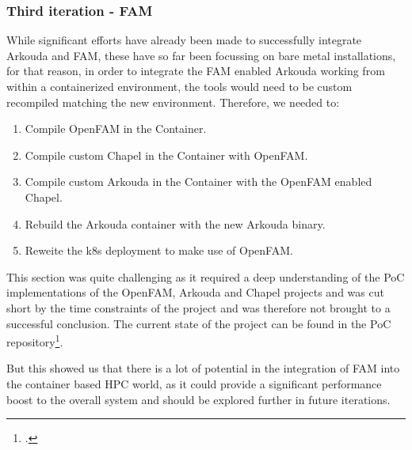 \subsubsection{Third iteration - \ac{FAM}}
\label{third_iteration_fam}
While significant efforts have already been made to successfully integrate Arkouda and \ac{FAM}, these have so far been focussing on bare metal installations, for that reason, in order to integrate the \ac{FAM} enabled Arkouda working from within a containerized environment, the tools would need to be 
custom recompiled matching the new environment. 
Therefore, we needed to:

\begin{enumerate}
    \item Compile OpenFAM in the Container.
    \item Compile custom Chapel in the Container with OpenFAM.
    \item Compile custom Arkouda in the Container with the OpenFAM enabled Chapel.
    \item Rebuild the Arkouda container with the new Arkouda binary.
    \item Reweite the \ac{k8s} deployment to make use of OpenFAM.
\end{enumerate}

This section was quite challenging as it required a deep understanding of the \ac{PoC} implementations of the OpenFAM, Arkouda and Chapel projects and was cut short by the time constraints of the project and was therefore not brought to a successful conclusion.
The current state of the project can be found in the \ac{PoC} repository\footcite{Todo}. 

But this showed us that there is a lot of potential in the integration of \ac{FAM} into the container based \ac{HPC} world, as it could provide a significant performance boost to the overall system and should be explored further in future iterations.

